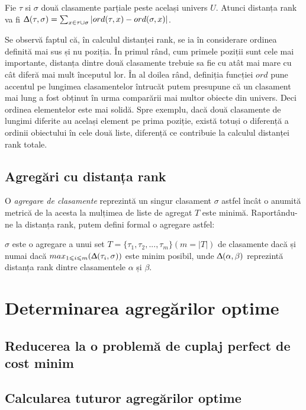 \begin{definition}
  Fie $\tau$ si $\sigma$ două clasamente parțiale peste același univers $U$. Atunci distanța rank va
  fi $\Updelta(\tau, \sigma) = \sum_{x \in \tau \cup \sigma} |ord(\tau, x) - ord(\sigma, x)|$.
\end{definition}

Se observă faptul că, în calculul distanței rank, se ia în considerare ordinea definită mai sus
și nu poziția. În primul rând, cum primele poziții sunt cele mai importante, distanța dintre două
clasamente trebuie sa fie cu atât mai mare cu cât diferă mai mult începutul lor\cite{linguisticstructuresmarcus}.
În al doilea rând, definiția funcției $ord$ pune accentul pe lungimea clasamentelor întrucăt putem
presupune că un clasament mai lung a fost obținut în urma comparării mai multor obiecte din univers.
Deci ordinea elementelor este mai solidă. Spre exemplu, dacă două clasamente de lungimi diferite au
același element pe prima poziție, există totuși o diferență a ordinii obiectului în cele două liste,
diferență ce contribuie la calculul distanței rank totale.\cite{rankaggregationproblem}

\subsection{Agregări cu distanța rank}
O \textit{agregare de clasamente} reprezintă un singur clasament $\sigma$ astfel încât o anumită 
metrică de la acesta la mulțimea de liste de agregat $T$ este minimă. Raportându-ne la distanța rank,
putem defini formal o agregare astfel:

\begin{definition}
$\sigma$ este o agregare a unui set $T = \{\tau_1, \tau_2, ..., \tau_m\} (m = |T|)$ de clasamente 
dacă și numai dacă $max_{1 \leqslant i \leqslant m}(\Updelta(\tau_i, \sigma))$ este minim posibil,
unde $\Updelta(\alpha, \beta)$ reprezintă distanța rank dintre clasamentele $\alpha$ și $\beta$.
\end{definition}

\section{Determinarea agregărilor optime}
\subsection{Reducerea la o problemă de cuplaj perfect de cost minim}
\subsection{Calcularea tuturor agregărilor optime}
